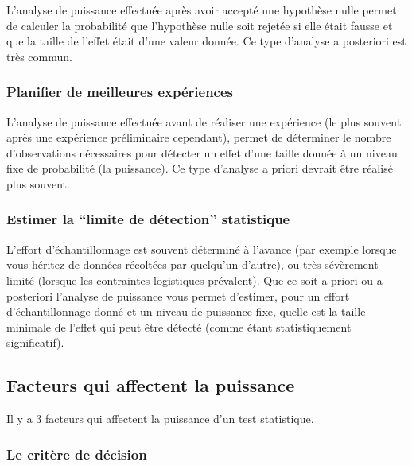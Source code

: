 \documentclass[12pt,]{book}
\begin{document}
L'analyse de puissance effectuée après avoir accepté une hypothèse nulle permet de calculer la probabilité que l'hypothèse nulle soit rejetée si elle était fausse et que la taille de l'effet était d'une valeur donnée.
Ce type d'analyse a posteriori est très commun.

\hypertarget{planifier-de-meilleures-expuxe9riences}{%
\subsubsection*{Planifier de meilleures expériences}\label{planifier-de-meilleures-expuxe9riences}}


L'analyse de puissance effectuée avant de réaliser une expérience (le plus souvent après une expérience préliminaire cependant), permet de déterminer le nombre d'observations nécessaires pour détecter un effet d'une taille donnée à un niveau fixe de probabilité (la puissance).
Ce type d'analyse a priori devrait être réalisé plus souvent.

\hypertarget{estimer-la-limite-de-duxe9tection-statistique}{%
\subsubsection*{Estimer la ``limite de détection'' statistique}\label{estimer-la-limite-de-duxe9tection-statistique}}


L'effort d'échantillonnage est souvent déterminé à l'avance (par exemple lorsque vous héritez de données récoltées par quelqu'un d'autre), ou très sévèrement limité (lorsque les contraintes logistiques prévalent).
Que ce soit a priori ou a posteriori l'analyse de puissance vous permet d'estimer, pour un effort d'échantillonnage donné et un niveau de puissance fixe, quelle est la taille minimale de l'effet qui peut être détecté (comme étant statistiquement significatif).

\hypertarget{facteurs-qui-affectent-la-puissance}{%
\subsection{Facteurs qui affectent la puissance}\label{facteurs-qui-affectent-la-puissance}}

Il y a 3 facteurs qui affectent la puissance d'un test statistique.

\hypertarget{le-crituxe8re-de-duxe9cision}{%
\subsubsection*{Le critère de décision}\label{le-crituxe8re-de-duxe9cision}}
\end{document}
